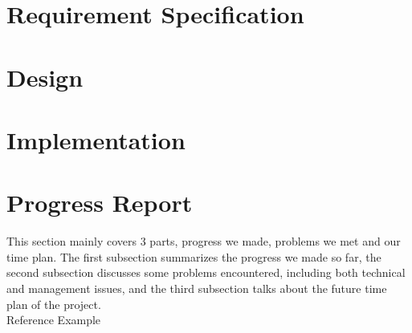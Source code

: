 \documentclass[paper=a4, fontsize=11pt,twoside]{scrartcl}		%
\begin{document}
\section{Requirement Specification}
\clearpage

\section{Design}
\clearpage

\section{Implementation}
\clearpage

\section{Progress Report}
This section mainly covers 3 parts, progress we made, problems we met and our time plan. The first subsection summarizes the progress we made so far, the second subsection discusses some problems encountered, including both technical and management issues, and the third subsection talks about the future time plan of the project. \\
Reference Example\cite{Debray:2000:CTC:349214.349233}
\end{document}
